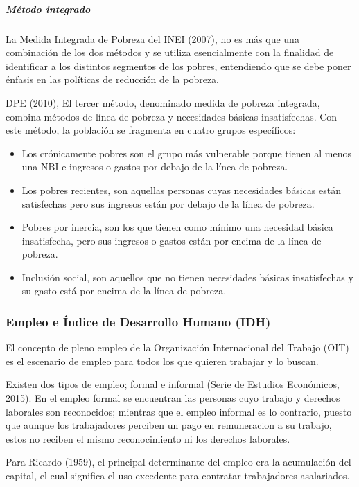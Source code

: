   \subparagraph{Método integrado}

La Medida Integrada de Pobreza del INEI (2007), no es más que una combinación de los dos métodos y se utiliza esencialmente con la finalidad de identificar a los distintos segmentos de los pobres, entendiendo que se debe poner énfasis en las políticas de reducción de la pobreza. 

DPE (2010), El tercer método, denominado medida de pobreza integrada, combina métodos de línea de pobreza y necesidades básicas insatisfechas. Con este método, la población se fragmenta en cuatro grupos específicos:

\begin{itemize}
\item Los crónicamente pobres son el grupo más vulnerable porque tienen al menos una NBI e ingresos o gastos por debajo de la línea de pobreza. 

\item Los pobres recientes, son aquellas personas cuyas necesidades básicas están satisfechas pero sus ingresos están por debajo de la línea de pobreza. 

\item Pobres por inercia, son los que tienen como mínimo una necesidad básica insatisfecha, pero sus ingresos o gastos están por encima de la línea de pobreza. 

\item Inclusión social, son aquellos que no tienen necesidades básicas insatisfechas y su gasto está por encima de la línea de pobreza.

\end{itemize}

  \subsubsection{Empleo e Índice de Desarrollo Humano (IDH)}
El concepto de pleno empleo de la Organización Internacional del Trabajo (OIT) es el escenario de empleo para todos los que quieren trabajar y lo buscan.

Existen dos tipos de empleo; formal e informal (Serie de Estudios Económicos, 2015). En el empleo formal se encuentran las personas cuyo trabajo y derechos laborales son reconocidos; mientras que el empleo informal es lo contrario, puesto que aunque los trabajadores perciben un pago en remuneracion a su trabajo, estos no reciben el mismo reconocimiento ni los derechos laborales.

Para Ricardo (1959), el principal determinante del empleo era la acumulación del capital, el cual significa el uso excedente para contratar trabajadores asalariados.

